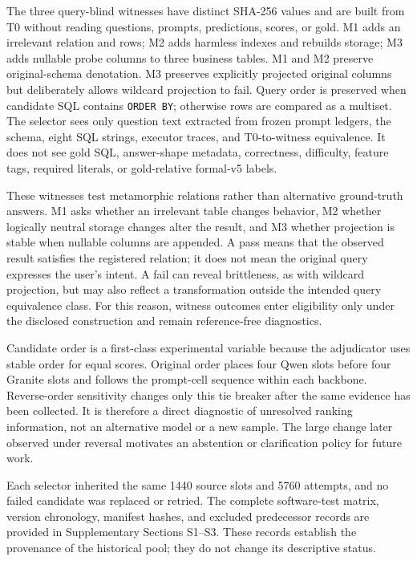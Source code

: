 \documentclass[applsci,article,submit,moreauthors]{Definitions/mdpi}
\begin{document}
The three query-blind witnesses have distinct SHA-256 values and are built from T0 without reading questions, prompts, predictions, scores, or gold. M1 adds an irrelevant relation and rows; M2 adds harmless indexes and rebuilds storage; M3 adds nullable probe columns to three business tables. M1 and M2 preserve original-schema denotation. M3 preserves explicitly projected original columns but deliberately allows wildcard projection to fail. Query order is preserved when candidate SQL contains \texttt{ORDER BY}; otherwise rows are compared as a multiset. The selector sees only question text extracted from frozen prompt ledgers, the schema, eight SQL strings, executor traces, and T0-to-witness equivalence. It does not see gold SQL, answer-shape metadata, correctness, difficulty, feature tags, required literals, or gold-relative formal-v5 labels.

These witnesses test metamorphic relations rather than alternative ground-truth answers. M1 asks whether an irrelevant table changes behavior, M2 whether logically neutral storage changes alter the result, and M3 whether projection is stable when nullable columns are appended. A pass means that the observed result satisfies the registered relation; it does not mean the original query expresses the user's intent. A fail can reveal brittleness, as with wildcard projection, but may also reflect a transformation outside the intended query equivalence class. For this reason, witness outcomes enter eligibility only under the disclosed construction and remain reference-free diagnostics.

Candidate order is a first-class experimental variable because the adjudicator uses stable order for equal scores. Original order places four Qwen slots before four Granite slots and follows the prompt-cell sequence within each backbone. Reverse-order sensitivity changes only this tie breaker after the same evidence has been collected. It is therefore a direct diagnostic of unresolved ranking information, not an alternative model or a new sample. The large change later observed under reversal motivates an abstention or clarification policy for future work.

Each selector inherited the same 1440 source slots and 5760 attempts, and no failed candidate was replaced or retried. The complete software-test matrix, version chronology, manifest hashes, and excluded predecessor records are provided in Supplementary Sections S1--S3. These records establish the provenance of the historical pool; they do not change its descriptive status.
\end{document}
